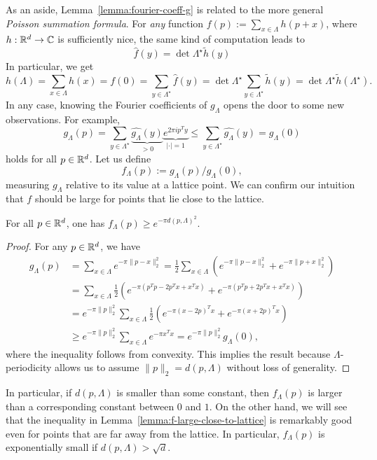 As an aside,
Lemma~\ref{lemma:fourier-coeff-g} is related to the more general \emph{Poisson summation formula}.
For \emph{any} function $f(p) := \sum_{x \in \Lambda} h(p+x)$, where $h : \mathbb{R}^d \to \mathbb{C}$ is sufficiently nice,
the same kind of computation leads to
\[
  \hat f(y) = \det\Lambda^\star \tilde h(y)
\]
In particular, we get
\[
  h(\Lambda) = \sum_{x\in\Lambda} h(x)
    = f(0) = \sum_{y \in \Lambda^\star} \hat f(y)
    = \det\Lambda^\star \sum_{y \in \Lambda^\star} \tilde h(y) = \det\Lambda^\star \tilde h(\Lambda^\star).
\]
In any case, knowing the Fourier coefficients of $g_\Lambda$
opens the door to some new observations.
For example,
\[
  g_\Lambda(p) = \sum_{y \in \Lambda^\star} \underbrace{\widehat{g_\Lambda}(y)}_{> 0} \underbrace{e^{2\pi i p^T y}}_{|\cdot| = 1}
  \leq \sum_{y \in \Lambda^\star} \widehat{g_\Lambda}(y) = g_\Lambda(0)
\]
holds for all $p \in \mathbb{R}^d$.
Let us define
\[
  f_\Lambda(p) := g_\Lambda(p) / g_\Lambda(0),
\]
measuring $g_\Lambda$ relative to its value at a lattice point.
We can confirm our intuition that $f$ should be large for points that lie close to the lattice.

\begin{lemma}
  \label{lemma:f-large-close-to-lattice}
  For all $p \in \mathbb{R}^d$, one has $f_\Lambda(p) \geq e^{-\pi d(p,\Lambda)^2}$.
\end{lemma}
\begin{proof}
  For any $p \in \mathbb{R}^d$, we have
  \begin{align*}
    g_\Lambda(p) &= \sum_{x\in\Lambda} e^{-\pi \|p - x\|_2^2}
      = \frac{1}{2} \sum_{x\in\Lambda} \left( e^{-\pi \|p-x\|_2^2} + e^{-\pi \|p+x\|_2^2} \right) \\
      &= \sum_{x\in\Lambda} \frac{1}{2} \left( e^{-\pi (p^Tp - 2p^Tx + x^T x)} + e^{-\pi (p^Tp + 2p^Tx + x^Tx)} \right) \\
      &= e^{-\pi \|p\|_2^2} \sum_{x\in\Lambda} \frac{1}{2} \left( e^{-\pi (x - 2p)^T x} + e^{-\pi (x + 2p)^T x} \right) \\
      &\geq e^{-\pi \|p\|_2^2} \sum_{x\in\Lambda} e^{-\pi x^Tx} = e^{-\pi \|p\|_2^2} g_\Lambda(0),
  \end{align*}
  where the inequality follows from convexity.
  This implies the result because $\Lambda$-periodicity allows us
  to assume $\|p\|_2 = d(p,\Lambda)$ without loss of generality.
\end{proof}

In particular, if $d(p,\Lambda)$ is smaller than some constant,
then $f_\Lambda(p)$ is larger than a corresponding constant between $0$ and $1$.
On the other hand,
we will see that the inequality in Lemma~\ref{lemma:f-large-close-to-lattice}
is remarkably good even for points that are far away from the lattice.
In particular, $f_\Lambda(p)$ is exponentially small if $d(p,\Lambda) > \sqrt{d}$.

